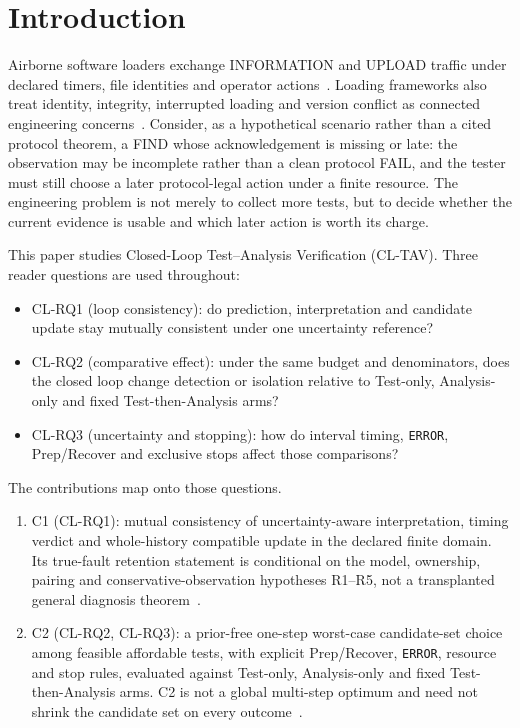 \section{Introduction}
\label{sec:intro}

Airborne software loaders exchange INFORMATION and UPLOAD traffic under declared
timers, file identities and operator actions~\cite{arinc615a3}. Loading
frameworks also treat identity, integrity, interrupted loading and version
conflict as connected engineering concerns~\cite{marques2021}. Consider, as a
hypothetical scenario rather than a cited protocol theorem, a FIND whose
acknowledgement is missing or late: the observation may be incomplete rather
than a clean protocol FAIL, and the tester must still choose a later
protocol-legal action under a finite resource. The engineering problem is not
merely to collect more tests, but to decide whether the current evidence is
usable and which later action is worth its charge.

This paper studies Closed-Loop Test--Analysis Verification (CL-TAV). Three
reader questions are used throughout:
\begin{itemize}
\item CL-RQ1 (loop consistency): do prediction, interpretation and candidate
update stay mutually consistent under one uncertainty reference?
\item CL-RQ2 (comparative effect): under the same budget and denominators, does
the closed loop change detection or isolation relative to Test-only,
Analysis-only and fixed Test-then-Analysis arms?
\item CL-RQ3 (uncertainty and stopping): how do interval timing, \texttt{ERROR},
Prep/Recover and exclusive stops affect those comparisons?
\end{itemize}

The contributions map onto those questions.
\begin{enumerate}
\item C1 (CL-RQ1): mutual consistency of uncertainty-aware interpretation,
timing verdict and whole-history compatible update in the declared finite
domain. Its true-fault retention statement is conditional on the model,
ownership, pairing and conservative-observation hypotheses R1--R5, not a
transplanted general diagnosis theorem~\cite{koehl2023,fraenzle2026,sampath1998}.
\item C2 (CL-RQ2, CL-RQ3): a prior-free one-step worst-case candidate-set choice
among feasible affordable tests, with explicit Prep/Recover, \texttt{ERROR},
resource and stop rules, evaluated against Test-only, Analysis-only and fixed
Test-then-Analysis arms. C2 is not a global multi-step optimum and need not
shrink the candidate set on every outcome~\cite{chanthery2009,hu2020,miao2025}.
\end{enumerate}

